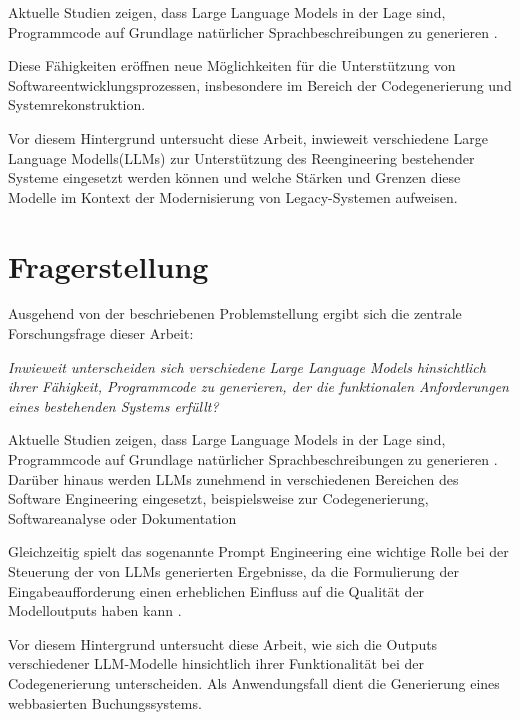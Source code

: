 Aktuelle Studien zeigen, dass Large Language Models in der Lage 
sind, Programmcode auf Grundlage natürlicher Sprachbeschreibungen 
zu generieren \cite{fan2023largelanguagemodelssoftware}.

Diese Fähigkeiten eröffnen neue Möglichkeiten für die Unterstützung von Softwareentwicklungsprozessen, insbesondere im Bereich der Codegenerierung und Systemrekonstruktion.

Vor diesem Hintergrund untersucht diese Arbeit, inwieweit verschiedene Large Language Modells(LLMs) zur Unterstützung des Reengineering bestehender Systeme eingesetzt werden können und welche Stärken und Grenzen diese Modelle im Kontext der Modernisierung von Legacy-Systemen aufweisen.
\section{Fragerstellung}
Ausgehend von der beschriebenen Problemstellung ergibt sich 
die zentrale Forschungsfrage dieser Arbeit:

\textit{Inwieweit unterscheiden sich verschiedene Large Language 
Models hinsichtlich ihrer Fähigkeit, Programmcode zu generieren, 
der die funktionalen Anforderungen eines bestehenden Systems erfüllt?}

Aktuelle Studien zeigen, dass Large Language Models in der Lage 
sind, Programmcode auf Grundlage natürlicher Sprachbeschreibungen 
zu generieren \cite{chen2021evaluatinglargelanguagemodels}. Darüber hinaus werden LLMs zunehmend 
in verschiedenen Bereichen des Software Engineering eingesetzt, 
beispielsweise zur Codegenerierung, Softwareanalyse oder 
Dokumentation \cite{LLMinSEreviewandvision}

Gleichzeitig spielt das sogenannte Prompt Engineering eine wichtige 
Rolle bei der Steuerung der von LLMs generierten Ergebnisse, da die 
Formulierung der Eingabeaufforderung einen erheblichen Einfluss auf 
die Qualität der Modelloutputs haben kann \cite{reynolds2021promptprogramminglargelanguage}.

Vor diesem Hintergrund untersucht diese Arbeit, wie sich die 
Outputs verschiedener LLM-Modelle hinsichtlich ihrer Funktionalität 
bei der Codegenerierung unterscheiden. Als Anwendungsfall dient die 
Generierung eines webbasierten Buchungssystems.
